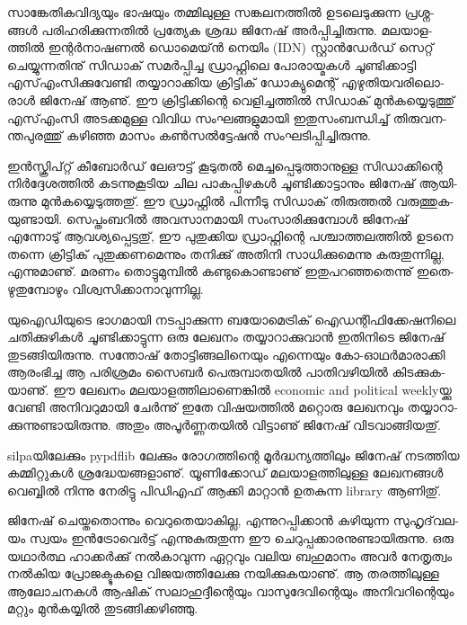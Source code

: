 ­സാ­ങ്കേ­തി­ക­വി­ദ്യ­യും ഭാ­ഷ­യും തമ്മി­ലു­ള്ള സങ്ക­ല­ന­ത്തില്‍ ഉട­ലെ­ടു­ക്കു­ന്ന പ്ര­ശ്ന­ങ്ങള്‍ പരി­ഹ­രി­ക്കു­ന്ന­തില്‍ പ്ര­ത്യേക ശ്ര­ദ്ധ ജി­നേ­ഷ് 
അര്‍­പ്പി­ച്ചി­രു­ന്നു. മല­യാ­ള­ത്തില്‍ ഇന്റര്‍­നാ­ഷ­ണല്‍ ഡൊ­മെ­യ്ന്‍ നെ­യിം (IDN) സ്റ്റാന്‍­ഡേര്‍­ഡ് സെ­റ്റ് ചെ­യ്യു­ന്ന­തി­നു് സി­ഡാ­ക്‍ 
സമര്‍­പ്പി­ച്ച ഡ്രാ­ഫ്റ്റി­ലെ പോ­രാ­യ്മ­കള്‍ ചൂ­ണ്ടി­ക്കാ­ട്ടി എസ്എം­സി­ക്കു­വേ­ണ്ടി തയ്യാ­റാ­ക്കിയ ക്രി­ട്ടി­ക്‍ ഡോ­ക്യു­മെ­ന്റ് 
എഴു­തി­യ­വ­രി­ലൊ­രാള്‍ ജി­നേ­ഷ് ആണു്. ഈ ക്രി­ട്ടി­ക്കി­ന്റെ വെ­ളി­ച്ച­ത്തില്‍ സി­ഡാ­ക്‍ മുന്‍­ക­യ്യെ­ടു­ത്തു് എസ്എം­സി അട­ക്ക­മു­ള്ള 
വി­വിധ സം­ഘ­ങ്ങ­ളു­മാ­യി ഇതു­സം­ബ­ന്ധി­ച്ച് തി­രു­വ­ന­ന്ത­പു­ര­ത്തു് കഴി­ഞ്ഞ മാ­സം കണ്‍­സല്‍­ട്ടേ­ഷന്‍ സം­ഘ­ടി­പ്പി­ച്ചി­രു­ന്നു­.

ഇന്‍­സ്ക്രി­പ്റ്റ് കീ­ബോര്‍­ഡ് ലേ­ഔ­ട്ട് കൂ­ടു­തല്‍ മെ­ച്ച­പ്പെ­ടു­ത്താ­നു­ള്ള സി­ഡാ­ക്കി­ന്റെ നിര്‍­ദ്ദേ­ശ­ത്തില്‍ കട­ന്നു­കൂ­ടിയ ചില പാ­ക­പ്പി­ഴ­കള്‍ 
ചൂ­ണ്ടി­ക്കാ­ട്ടാ­നും ജി­നേ­ഷ് ആയി­രു­ന്നു മുന്‍­ക­യ്യെ­ടു­ത്ത­തു്. ഈ ഡ്രാ­ഫ്റ്റില്‍ പി­ന്നീ­ടു സി­ഡാ­ക്‍ തി­രു­ത്തല്‍ വരു­ത്തു­ക­യു­ണ്ടാ­യി. 
സെ­പ്തം­ബ­റില്‍ അവ­സാ­ന­മാ­യി സം­സാ­രി­ക്കു­മ്പോള്‍ ജി­നേ­ഷ് എന്നോ­ടു് ആവ­ശ്യ­പ്പെ­ട്ട­തു്, ഈ പു­തു­ക്കിയ ഡ്രാ­ഫ്റ്റി­ന്റെ 
പശ്ചാ­ത്ത­ല­ത്തില്‍ ഉട­നെ തന്നെ ക്രി­ട്ടി­ക്‍ പു­തു­ക്ക­ണ­മെ­ന്നും തനി­ക്കു് അതി­നി സാ­ധി­ക്കു­മെ­ന്നു കരു­തു­ന്നി­ല്ല, എന്നു­മാ­ണു്. ­മ­ര­ണം­ 
തൊ­ട്ടു­മു­മ്പില്‍ കണ്ടു­കൊ­ണ്ടാ­ണു് ഇതു­പ­റ­ഞ്ഞ­തെ­ന്നു് ഇതെ­ഴു­തു­മ്പോ­ഴും വി­ശ്വ­സി­ക്കാ­നാ­വു­ന്നി­ല്ല.

­യു­ഐ­ഡി­യു­ടെ ഭാ­ഗ­മാ­യി നട­പ്പാ­ക്കു­ന്ന ബയോ­മെ­ട്രി­ക്‍ ഐഡ­ന്റി­ഫി­ക്കേ­ഷ­നി­ലെ ചതി­ക്കു­ഴി­കള്‍ ചൂ­ണ്ടി­ക്കാ­ട്ടു­ന്ന ഒരു ലേ­ഖ­നം 
തയ്യാ­റാ­ക്കു­വാന്‍ ഇതി­നി­ടെ ജി­നേ­ഷ് തു­ട­ങ്ങി­യി­രു­ന്നു. സന്തോ­ഷ് തോ­ട്ടി­ങ്ങ­ലി­നെ­യും എന്നെ­യും കോ-ഓഥര്‍­മാ­രാ­ക്കി ആരം­ഭി­ച്ച 
ആ പരി­ശ്ര­മം സൈ­ബര്‍ പെ­രു­മ്പാ­ത­യില്‍ പാ­തി­വ­ഴി­യില്‍ കി­ട­ക്കു­ക­യാ­ണു്. ഈ ലേ­ഖ­നം മല­യാ­ള­ത്തി­ലാ­ണെ­ങ്കില്‍ 
economic and political weekly­യ്ക്കു വേ­ണ്ടി അനി­വ­റു­മാ­യി ചേര്‍­ന്നു് ഇതേ വി­ഷ­യ­ത്തില്‍ മറ്റൊ­രു ലേ­ഖ­ന­വും 
തയ്യാ­റാ­ക്കു­ന്നു­ണ്ടാ­യി­രു­ന്നു. അതും അപൂര്‍­ണ്ണ­ത­യില്‍ വി­ട്ടാ­ണു് ജി­നേ­ഷ് വി­ട­വാ­ങ്ങി­യ­തു്.


silpa­യി­ലേ­ക്കും pypdflib ലേ­ക്കും രോ­ഗ­ത്തി­ന്റെ മൂര്‍­ദ്ധ­ന്യ­ത്തി­ലും ജി­നേ­ഷ് നട­ത്തിയ കമ്മിറ്റുകള്‍ ശ്ര­ദ്ധേ­യ­ങ്ങ­ളാ­ണു്. യൂ­ണി­ക്കോ­ഡ് 
മല­യാ­ള­ത്തി­ലു­ള്ള ലേ­ഖ­ന­ങ്ങള്‍ വെ­ബ്ബില്‍ നി­ന്നു നേ­രി­ട്ടു ­പി­ഡി­എ­ഫ് ആക്കി മാ­റ്റാന്‍ ഉത­കു­ന്ന library ആണി­തു്.

­ജി­നേ­ഷ് ചെ­യ്ത­തൊ­ന്നും വെ­റു­തെ­യാ­കി­ല്ല, എന്നു­റ­പ്പി­ക്കാന്‍ കഴി­യു­ന്ന സു­ഹൃ­ദ്‌­വ­ല­യം സ്വ­യം ഇന്‍­ട്രോ­വെര്‍­ട്ട് എന്നു­കു­രു­തു­ന്ന 
ഈ ചെ­റു­പ്പ­ക്കാ­ര­നു­ണ്ടാ­യി­രു­ന്നു. ഒരു യഥാര്‍­ത്ഥ ഹാ­ക്കര്‍­ക്കു് നല്‍­കാ­വു­ന്ന ഏറ്റ­വും വലിയ ബഹു­മാ­നം അവര്‍ നേ­തൃ­ത്വം 
നല്‍­കിയ പ്രോ­ജ­ക്ടു­ക­ളെ വി­ജ­യ­ത്തി­ലേ­ക്കു നയി­ക്കു­ക­യാ­ണു്. ആ തര­ത്തി­ലു­ള്ള ആലോ­ച­ന­കള്‍ ആഷി­ക്‍ സലാ­ഹു­ദ്ദീ­ന്റെ­യും 
വാ­സു­ദേ­വി­ന്റെ­യും അനി­വ­റി­ന്റെ­യും മറ്റും മുന്‍­ക­യ്യില്‍ തു­ട­ങ്ങി­ക്ക­ഴി­ഞ്ഞു­.

